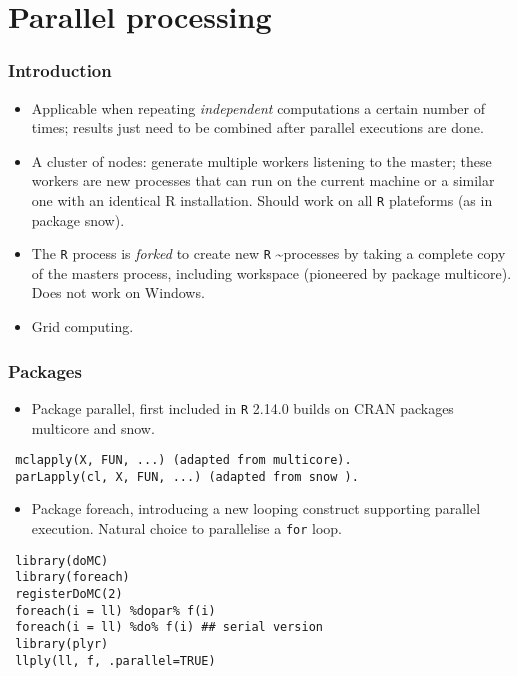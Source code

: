 \documentclass{beamer}
\newcommand{\R}{\texttt{R} }
\newcommand{\Rpackage}[1]{{\mbox{\normalfont\textsf{#1}}}}
\begin{document}
\section{Parallel processing}
\label{sec-5}
\begin{frame}
\frametitle{Introduction}
\label{sec-5-1}

\begin{itemize}
\item Applicable when repeating \textit{independent} computations a certain number of times; results just need to be combined after parallel executions are done.
\item A cluster of nodes: generate multiple workers listening to the master; these workers are new processes that can run on the current machine or a similar one with an identical R installation. Should work on all \R plateforms (as in package \Rpackage{snow}).
\item The \R process is \textit{forked} to create new \R\~{}processes by taking a complete copy of the masters process, including workspace (pioneered by package \Rpackage{multicore}). Does not work on Windows.
\item Grid computing.
\end{itemize}
\end{frame}
\begin{frame}[fragile]
\frametitle{Packages}
\label{sec-5-2}

\begin{itemize}
\item Package \Rpackage{parallel}, first included in \R 2.14.0 builds on CRAN packages \Rpackage{multicore} and \Rpackage{snow}.
\end{itemize}
\begin{verbatim}
 mclapply(X, FUN, ...) (adapted from multicore).
 parLapply(cl, X, FUN, ...) (adapted from snow ).
\end{verbatim}

\begin{itemize}
\item Package \Rpackage{foreach}, introducing a new looping construct supporting parallel execution. Natural choice to parallelise a \texttt{for} loop.
\end{itemize}
\begin{verbatim}
 library(doMC)
 library(foreach)
 registerDoMC(2)
 foreach(i = ll) %dopar% f(i)
 foreach(i = ll) %do% f(i) ## serial version
 library(plyr)
 llply(ll, f, .parallel=TRUE)
\end{verbatim}
\end{frame}
\end{document}
